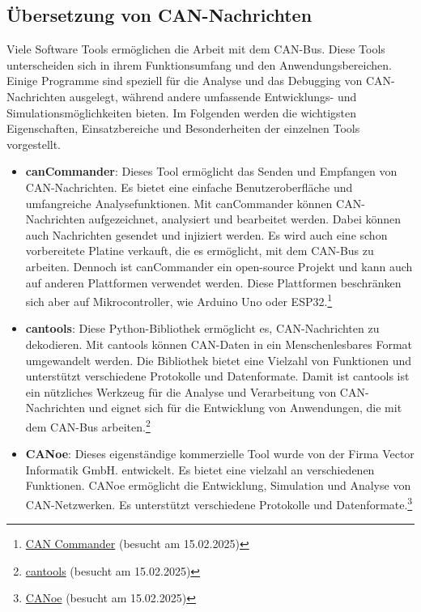 \subsection{Übersetzung von CAN-Nachrichten} \label{sec:canTranslation}
Viele Software Tools ermöglichen die Arbeit mit dem CAN-Bus. Diese Tools unterscheiden sich in ihrem Funktionsumfang
und den Anwendungsbereichen.
Einige Programme sind speziell für die Analyse und das Debugging von CAN-Nachrichten 
ausgelegt, während andere umfassende Entwicklungs- und Simulationsmöglichkeiten bieten. Im Folgenden werden die wichtigsten 
Eigenschaften, Einsatzbereiche und Besonderheiten der einzelnen Tools vorgestellt. \\
\begin{itemize}
    \item \textbf{canCommander}: Dieses Tool ermöglicht das Senden und Empfangen von CAN-Nachrichten. Es bietet eine einfache 
    Benutzeroberfläche und umfangreiche Analysefunktionen. Mit canCommander können CAN-Nachrichten aufgezeichnet, 
    analysiert und bearbeitet werden. Dabei können auch Nachrichten gesendet und injiziert werden. Es wird auch eine
    schon vorbereitete Platine verkauft, die es ermöglicht, mit dem CAN-Bus zu arbeiten. Dennoch ist canCommander ein
    open-source Projekt und kann auch auf anderen Plattformen verwendet werden. Diese Plattformen beschränken sich aber
    auf Mikrocontroller, wie Arduino Uno oder 
    ESP32.\footnote{\href{https://github.com/MatthewKuKanich/CAN_Commander}{CAN Commander} (besucht am 15.02.2025)}
    \item \textbf{cantools}: Diese Python-Bibliothek ermöglicht es, CAN-Nachrichten zu dekodieren. Mit cantools können 
    CAN-Daten in ein Menschenlesbares Format umgewandelt werden. Die Bibliothek 
    bietet eine Vielzahl von Funktionen und unterstützt verschiedene Protokolle und Datenformate. Damit ist cantools ist ein 
    nützliches Werkzeug für die Analyse und Verarbeitung von CAN-Nachrichten und eignet sich für die Entwicklung von 
    Anwendungen, die mit dem CAN-Bus arbeiten.\footnote{\href{https://github.com/cantools/cantools/releases}{cantools} (besucht am 15.02.2025)}
    \item \textbf{CANoe}: Dieses eigenständige kommerzielle Tool wurde von der Firma Vector Informatik GmbH. entwickelt.
    Es bietet eine vielzahl an verschiedenen Funktionen. CANoe ermöglicht die Entwicklung, Simulation und Analyse von
    CAN-Netzwerken. Es unterstützt verschiedene Protokolle und 
    Datenformate.\footnote{\href{https://www.vector.com/de/de/produkte/produkte-a-z/software/canoe/}{CANoe} (besucht am 15.02.2025)}

\end{itemize}
